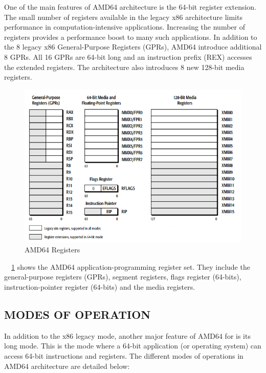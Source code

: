 \documentclass[a4paper,12pt]{report}
\begin{document}
One of the main features of AMD64 architecture is the 64-bit register extension. The small number of registers available in the legacy x86 architecture limits performance in computation-intensive applications. Increasing the number of registers provides a performance boost to many such applications. In addition to the 8 legacy x86 General-Purpose Registers (GPRs), AMD64 introduce additional 8 GPRs. All 16 GPRs are 64-bit long and an instruction prefix (REX) accesses the extended registers. The architecture also introduces 8 new 128-bit media registers.
\begin{figure}[h!]
\centering
\includegraphics[scale=0.65]{./figures/registers.png}
\caption{AMD64 Registers}
\label{fig:registers.png}
\end{figure}


~\figurename{~\ref{fig:registers.png}} shows the AMD64 application-programming register set. They include the general-purpose registers (GPRs), segment registers, flags register (64-bits), instruction-pointer register (64-bits) and the media registers. 

\subsection{MODES OF OPERATION}
In addition to the x86 legacy mode, another major feature of AMD64 for is its long mode. This is the mode where a 64-bit application (or operating system) can access 64-bit instructions and registers.%
The different modes of operations in AMD64 architecture are detailed below:
\end{document}
